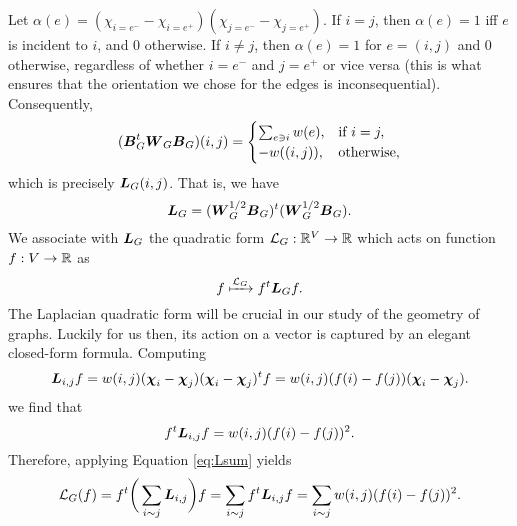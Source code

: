 Let $\alpha(e)=(\chi_{i=e^-}-\chi_{i=e^+})(\chi_{j=e^-}-\chi_{j=e^+})$. If $i=j$, then $\alpha(e)=1$ iff $e$ is incident to $i$, and 0 otherwise. If $i\neq j$, then $\alpha(e)=1$ for $e=(i,j)$ and 0 otherwise, regardless of whether $i=e^-$ and $j=e^+$ or vice versa (this is what ensures that the orientation we chose for the edges is inconsequential). Consequently, 
\begin{align*}
(\vb*{B}_G^t\vb*{W}_G\vb*{B}_G)(i,j) = 
\begin{cases}
\sum_{e\ni i} w(e),&\text{if } i=j,\\
-w((i,j)),&\text{otherwise}, 
\end{cases}
\end{align*}
which is precisely $\vb*{L}_G(i,j)$. That is, we have 
 \begin{equation}
 \label{eq:L=BTB}
 \vb*{L}_G=(\vb*{W}_G^{1/2}\vb*{B}_G)^t(\vb*{W}_G^{1/2}\vb*{B}_G).
 \end{equation}
 We associate with $\vb*{L}_G$ the quadratic form $\mathcal{L}_G:\mathbb{R}^V\to \mathbb{R}$ which acts on function $f:V\to \mathbb{R}$ as 
\begin{equation*}
 f\xmapsto{\mathcal{L}_G} f^t \vb*{L}_G f.
\end{equation*}
The Laplacian quadratic form will be crucial in our study of the geometry of graphs. Luckily for us then, its action on a vector is captured by an elegant closed-form formula. 
Computing 
\begin{equation*}
    \vb*{L}_{i,j}f = w(i,j)(\boldsymbol{\chi}_i -\boldsymbol{\chi}_j)(\boldsymbol{\chi}_i-\boldsymbol{\chi}_j)^t f = w(i,j)(f(i)-f(j))(\boldsymbol{\chi}_i-\boldsymbol{\chi}_j).
\end{equation*}
we find that 
\[f^t \vb*{L}_{i,j} f = w(i,j)(f(i)-f(j))^2.\]
Therefore, applying Equation \ref{eq:Lsum} yields 
\begin{equation}
\label{eq:Lf}
    \mathcal{L}_G(f) = f^t \bigg(\sum_{i\sim j} \vb*{L}_{i,j}\bigg) f = \sum_{i\sim j}f^t \vb*{L}_{i,j} f= \sum_{i\sim j} w(i,j)(f(i)-f(j))^2.
\end{equation}

